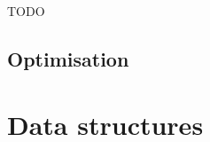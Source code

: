 \documentclass[thesis]{subfiles}
\begin{document}
\begin{example}

\begin{listing}
  \centering
  \begin{minipage}{.8\textwidth}
    \inputminted{c}{./scripts/artefacts/codegen_example2_c_code_tidy.c}
  \end{minipage}
  \caption{
    TODO
  }
  \label{listing:codegen_example2_c_code}
\end{listing}


\end{example}

\subsection{Optimisation}

\cite{stroutSparsePolyhedralFramework2018} %
\cite{mirchandaneyPrinciplesRuntimeSupport1988} %
\cite{arenazInspectorExecutorAlgorithmIrregular2004} %

\section{Data structures}
\label{sec:data_structures}
\end{document}
